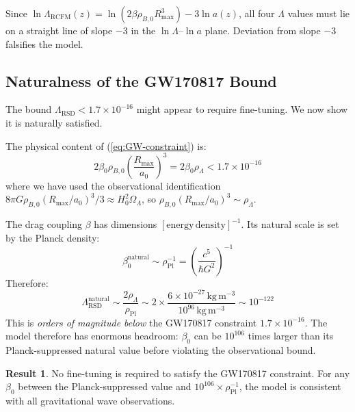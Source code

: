 \documentclass[10pt,twocolumn]{article}
\theoremstyle{definition}
\newtheorem{result}{Result}
\newcommand{\Rmax}{R_{\max}}
\begin{document}
Since
$\ln\Lambda_{\mathrm{RCFM}}(z)=
\ln(2\beta\rho_{B,0}\Rmax^{3})-3\ln a(z)$,
all four \( \Lambda \) values must lie on a straight line
of slope \( -3 \) in the \( \ln\Lambda \)--\( \ln a \) plane.
Deviation from slope \( -3 \) falsifies the model.

\subsection{Naturalness of the GW170817 Bound}
\label{sec:naturalness}

The bound \( \Lambda_{\mathrm{RSD}}<1.7\times10^{-16} \)
might appear to require fine-tuning.  We now show it is
naturally satisfied.

The physical content of (\ref{eq:GW-constraint}) is:
\begin{equation}
  2\beta_{0}\rho_{B,0}\left(\frac{\Rmax}{a_{0}}\right)^{3}
    = 2\beta_{0}\rho_{\Lambda}
    < 1.7\times10^{-16}
\end{equation}
where we have used the observational identification
$8\pi G\rho_{B,0}(\Rmax/a_{0})^{3}/3 \approx H_{0}^{2}\Omega_{\Lambda}$,
so \( \rho_{B,0}(\Rmax/a_{0})^{3}\sim\rho_{\Lambda} \).

The drag coupling \( \beta \) has dimensions
\( [\mathrm{energy\,density}]^{-1} \).  Its natural scale is
set by the Planck density:
\begin{equation}
  \beta_{0}^{\mathrm{natural}} \sim \rho_{\mathrm{Pl}}^{-1}
    = \left(\frac{c^{5}}{\hbar G^{2}}\right)^{-1}
\end{equation}
Therefore:
\begin{equation}
  \Lambda_{\mathrm{RSD}}^{\mathrm{natural}}
    \sim \frac{2\rho_{\Lambda}}{\rho_{\mathrm{Pl}}}
    \sim 2\times\frac{6\times10^{-27}\,\mathrm{kg\,m^{-3}}}
                     {10^{96}\,\mathrm{kg\,m^{-3}}}
    \sim 10^{-122}
\end{equation}
This is \emph{orders of magnitude below} the GW170817
constraint $1.7\times10^{-16}$.  The model therefore has
enormous headroom: \( \beta_{0} \) can be $10^{106}$ times
larger than its Planck-suppressed natural value before
violating the observational bound.

\begin{result}
No fine-tuning is required to satisfy the GW170817
constraint.  For any \( \beta_{0} \) between the
Planck-suppressed value and $10^{106}\times\rho_{\mathrm{Pl}}^{-1}$,
the model is consistent with all gravitational wave
observations.
\end{result}
\end{document}
